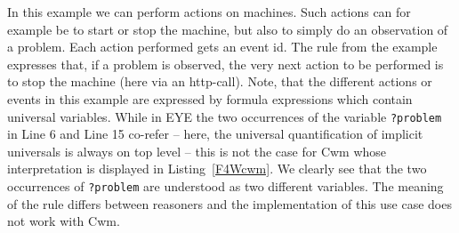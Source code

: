 In this example we can perform actions on machines. Such actions can for example be to start or stop the machine, but also to simply do an observation of a problem. Each action performed gets an event id. 
The rule from the example expresses that, if a problem is observed, the very next action to be performed is to stop the machine (here via an http-call). Note, that the different actions or events in this example 
are expressed by formula expressions which contain universal variables. While in EYE the two occurrences of the variable \texttt{?problem} in Line 6 and Line 15  co-refer -- here, 
the universal quantification of implicit universals is always on top level -- this is not the case for Cwm whose interpretation is displayed in Listing~\ref{F4Wcwm}.
We clearly see that the two occurrences of  
\texttt{?problem} are understood as two different variables. The meaning of the rule differs between reasoners 
and the implementation of this use case  does not work with Cwm. 







